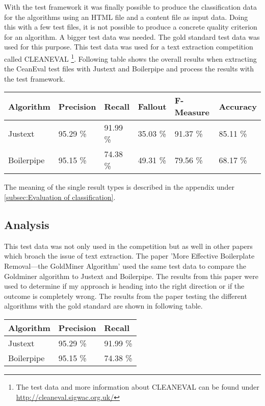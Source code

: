 With the test framework it was finally possible to produce the classification data for the  algorithms using an HTML file and a content file as input data. Doing this with a few test files, it is not possible to produce a concrete quality criterion for an algorithm. A bigger test data was needed. The gold standard test data was used for this purpose. This test data was used for a text extraction competition called CLEANEVAL \footnote{The test data and more information about CLEANEVAL can be found under \url{http://cleaneval.sigwac.org.uk/}}. 
Following table shows the overall results when extracting the CeanEval test files with Justext and Boilerpipe and process the results with the test framework.

\begin{tabular}{| p{2.2cm} | p{2.2cm} | p{2.2cm} | p{2.2cm} | p{2.2cm} | p{2.2cm} |}
    \hline
    \textbf{Algorithm}      & \textbf{Precision}  & \textbf{Recall}  & \textbf{Fallout}  & \textbf{F-Measure}  &\textbf{Accuracy} \\ \hline
    Justext     & 95.29 \%       &  91.99 \%  & 35.03 \% & 91.37 \% & 85.11 \%   \\ \hline
    Boilerpipe & 95.15 \%       &  74.38 \%  & 49.31 \% & 79.56 \% &  68.17 \% \\ \hline
\end{tabular}

The meaning of the single result types is described in the appendix under \ref{subsec:Evaluation of classification}.



\subsection{Analysis}

This test data was not only used in the competition but as well in other papers which broach the issue of text extraction. The paper 'More Effective Boilerplate Removal—the GoldMiner Algorithm' used the same test data to compare the Goldminer algorithm to Justext and Boilerpipe. The results from this paper were used to determine if my approach is heading into the right direction or if the outcome is completely wrong. 
The results from the paper testing the different algorithms with the gold standard  are shown in following table.

\begin{tabular}{| p{3cm} | p{3cm} | p{3cm} | }
    \hline
    \textbf{Algorithm}      & \textbf{Precision}  & \textbf{Recall} 				\\ \hline
    Justext     & 95.29 \%       &  91.99 \%		\\ \hline
    Boilerpipe & 95.15 \%       &  74.38 \%		\\ \hline
\end{tabular}

